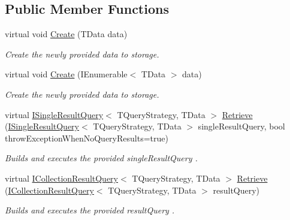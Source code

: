 \subsection*{Public Member Functions}
\begin{DoxyCompactItemize}
\item 
virtual void \hyperlink{classCqrs_1_1Repositories_1_1Repository_a5d5d78262533aa2ab32eddbab83869bd_a5d5d78262533aa2ab32eddbab83869bd}{Create} (T\+Data data)
\begin{DoxyCompactList}\small\item\em Create the newly provided {\itshape data}  to storage. \end{DoxyCompactList}\item 
virtual void \hyperlink{classCqrs_1_1Repositories_1_1Repository_a2af8103cc2946317f8ee9ede643bbc68_a2af8103cc2946317f8ee9ede643bbc68}{Create} (I\+Enumerable$<$ T\+Data $>$ data)
\begin{DoxyCompactList}\small\item\em Create the newly provided {\itshape data}  to storage. \end{DoxyCompactList}\item 
virtual \hyperlink{interfaceCqrs_1_1Repositories_1_1Queries_1_1ISingleResultQuery}{I\+Single\+Result\+Query}$<$ T\+Query\+Strategy, T\+Data $>$ \hyperlink{classCqrs_1_1Repositories_1_1Repository_a4f83093a92d8141cdc2b908bbbd97f32_a4f83093a92d8141cdc2b908bbbd97f32}{Retrieve} (\hyperlink{interfaceCqrs_1_1Repositories_1_1Queries_1_1ISingleResultQuery}{I\+Single\+Result\+Query}$<$ T\+Query\+Strategy, T\+Data $>$ single\+Result\+Query, bool throw\+Exception\+When\+No\+Query\+Results=true)
\begin{DoxyCompactList}\small\item\em Builds and executes the provided {\itshape single\+Result\+Query} . \end{DoxyCompactList}\item 
virtual \hyperlink{interfaceCqrs_1_1Repositories_1_1Queries_1_1ICollectionResultQuery}{I\+Collection\+Result\+Query}$<$ T\+Query\+Strategy, T\+Data $>$ \hyperlink{classCqrs_1_1Repositories_1_1Repository_ab1136a454f981848d49e0d0a2f4b6a2f_ab1136a454f981848d49e0d0a2f4b6a2f}{Retrieve} (\hyperlink{interfaceCqrs_1_1Repositories_1_1Queries_1_1ICollectionResultQuery}{I\+Collection\+Result\+Query}$<$ T\+Query\+Strategy, T\+Data $>$ result\+Query)
\begin{DoxyCompactList}\small\item\em Builds and executes the provided {\itshape result\+Query} . \end{DoxyCompactList}\item 

\end{DoxyCompactItemize}
